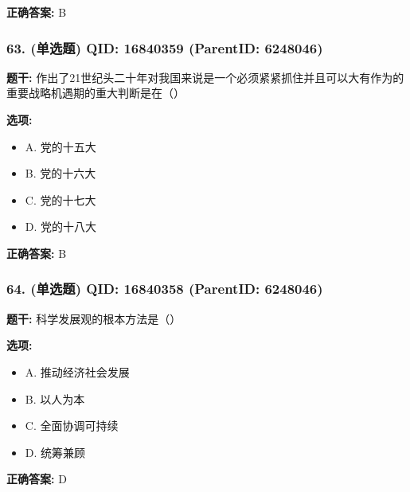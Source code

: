 \documentclass[12pt,UTF8]{ctexart}
\begin{document}
\textbf{正确答案:}
B

\vspace{0.3em}\hrulefill\vspace{0.7em}

\subsubsection*{63. (单选题) \small QID: 16840359 (ParentID: 6248046)}

\textbf{题干:}
作出了21世纪头二十年对我国来说是一个必须紧紧抓住并且可以大有作为的重要战略机遇期的重大判断是在（）



\textbf{选项:}
\begin{itemize}[leftmargin=*]

  \item A. 党的十五大

  \item B. 党的十六大

  \item C. 党的十七大

  \item D. 党的十八大

\end{itemize}

\textbf{正确答案:}
B

\vspace{0.3em}\hrulefill\vspace{0.7em}

\subsubsection*{64. (单选题) \small QID: 16840358 (ParentID: 6248046)}

\textbf{题干:}
科学发展观的根本方法是（）



\textbf{选项:}
\begin{itemize}[leftmargin=*]

  \item A. 推动经济社会发展

  \item B. 以人为本

  \item C. 全面协调可持续

  \item D. 统筹兼顾

\end{itemize}

\textbf{正确答案:}
D
\end{document}
